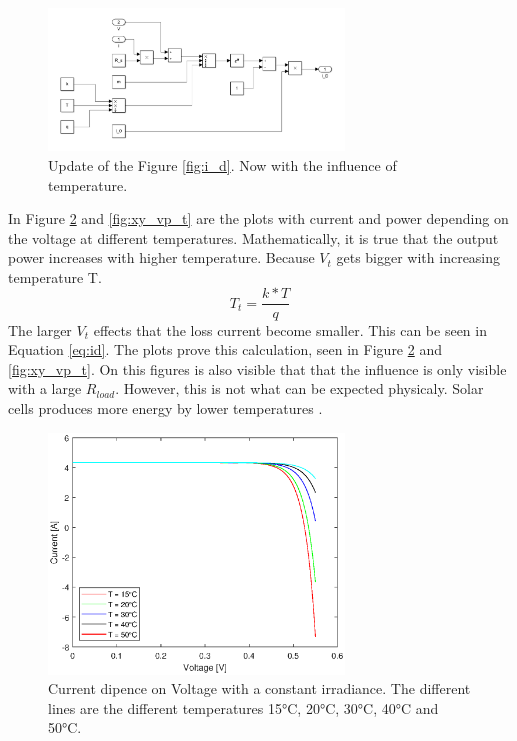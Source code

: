 	\begin{figure}[H]
		\centering
		\includegraphics[width=0.7\textwidth]{figures/i_ph_2.png}
		\caption{Update of the Figure \ref{fig:i_d}. Now with the influence of temperature.}
		\label{fig:i_d2}
	\end{figure}
In Figure \ref{fig:xy_vc_t} and \ref{fig:xy_vp_t} are the plots with current and power depending on the voltage at different temperatures.
Mathematically, it is true that the output power increases with higher temperature. Because $V_t$ gets bigger with increasing temperature T.
	\begin{equation}
		T_t = \frac{k * T}{q}
	\end{equation}
The larger $V_t$ effects that the loss current become smaller. This can be seen in Equation \ref{eq:id}. The plots prove this calculation, seen in Figure \ref{fig:xy_vc_t} and \ref{fig:xy_vp_t}. On this  figures is also visible that that the influence is only visible with a large $R_{load}$.
However, this is not what can be expected physicaly. Solar cells produces more energy by lower temperatures \cite{tiez} \cite{pv}.

	\begin{figure}[H]
		\centering
		\includegraphics[width=0.7\textwidth]{figures/xy_vc_t.eps}
		\caption[Current dipence on Voltage with a constant irradiance and different temperatures]{Current dipence on Voltage with a constant irradiance. The different lines are the different temperatures 15°C, 20°C, 30°C, 40°C and 50°C.}
		\label{fig:xy_vc_t}
	\end{figure}

